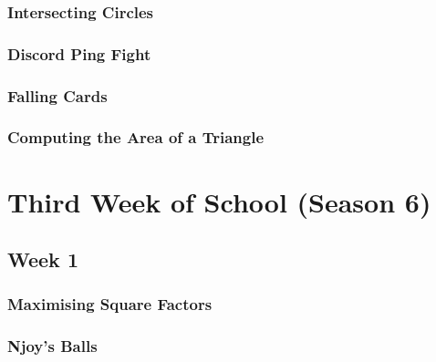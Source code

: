 \documentclass[titlepage=true]{scrartcl}
\begin{document}
        \subsubsection{Intersecting Circles}
            \label{5-2-4}
            
        \newpage

        \subsubsection{Discord Ping Fight}
            \label{5-2-5}
            
        \newpage

        \subsubsection{Falling Cards}
            \label{5-2-6}
            
        \newpage

        \subsubsection{Computing the Area of a Triangle}
            \label{5-2-7}
            
        \newpage

\section{Third Week of School (Season 6) }
                    
    \subsection{Week 1}

        \subsubsection{Maximising Square Factors}
            \label{6-1-1}
            
        \newpage

        \subsubsection{Njoy's Balls}
            \label{6-1-2}
            
        \newpage
\end{document}
